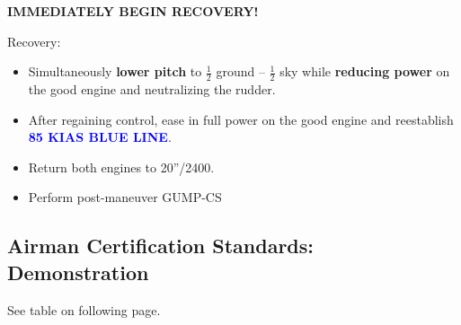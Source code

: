 {\textbf{IMMEDIATELY BEGIN RECOVERY!}

Recovery:
\begin{itemize}[label={}]
\item Simultaneously \textbf{lower pitch} to $\frac{1}{2}$ ground – $\frac{1}{2}$ sky while \textbf{reducing power} on the good engine and neutralizing the rudder.
\item After regaining control, ease in full power on the good engine and reestablish\\\textbf{\textcolor{blue}{85 KIAS BLUE LINE}}.
\item Return both engines to 20''/2400.
\item Perform post-maneuver GUMP-CS
\end{itemize}

\subsection{Airman Certification Standards: \vmc Demonstration}

See table on following page.

}
